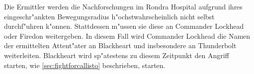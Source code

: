Die Ermittler werden die Nachforschungen im Rondra Hospital aufgrund ihres eingeschr"ankten Bewegungsradius h"ochstwahrscheinlich nicht selbst durchf"uhren k"onnen. Stattdessen m"ussen sie diese an Commander Lockhead oder Firedon weitergeben. In diesem Fall wird Commander Lockhead die Namen der ermittelten Attent"ater an Blackheart und insbesondere an Thunderbolt weiterleiten. Blackheart wird sp"atestens zu diesem Zeitpunkt den Angriff starten, wie \cref{sec:fightforcallisto} beschrieben, starten.
